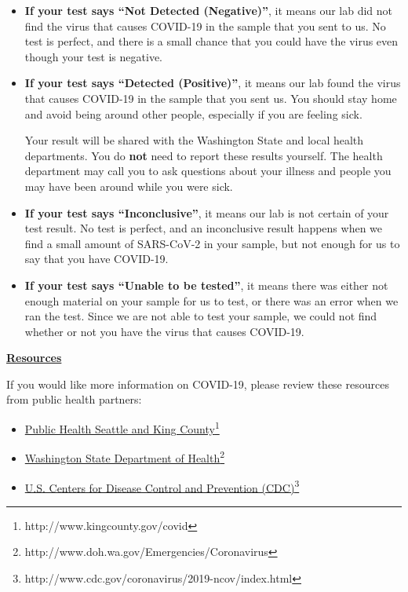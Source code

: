\documentclass[10pt]{article}
\newcommand{\link}[2]{\href{#1}{#2}\footnote{#1}}
\begin{document}
\begin{itemize}


\item

  \textbf{If your test says ``Not Detected (Negative)''}, it means our lab did not find the
  virus that causes COVID-19 in the sample that you sent to us. No test is
  perfect, and there is a small chance that you could have the virus even though
  your test is negative.

\item

  \textbf{If your test says ``Detected (Positive)''}, it means our
  lab found the virus that causes COVID-19 in the sample that you sent us. You
  should stay home and avoid being around other people, especially if you are
  feeling sick.

  Your result will be shared with the Washington State and local health
  departments. You do \textbf{not} need to report these results yourself. The
  health department may call you to ask questions about your illness and people
  you may have been around while you were sick.

\item

  \textbf{If your test says ``Inconclusive''}, it means our lab is not certain
  of your test result. No test is perfect, and an inconclusive result happens
  when we find a small amount of SARS-CoV-2 in your sample, but not enough for
  us to say that you have COVID-19.

\item

  \textbf{If your test says ``Unable to be tested''}, it means there was either
  not enough material on your sample for us to test, or there was an error when
  we ran the test. Since we are not able to test your sample, we could not find
  whether or not you have the virus that causes COVID-19.

\end{itemize}

\bigskip

\large \underline{\textbf{Resources}}

If you would like more information on COVID-19, please review these resources
from public health partners:

\begin{itemize}
\item

  \link{http://www.kingcounty.gov/covid}{Public Health Seattle and King County}

\item

  \link{http://www.doh.wa.gov/Emergencies/Coronavirus}{Washington State
  Department of Health}

\item

  \link{http://www.cdc.gov/coronavirus/2019-ncov/index.html}{U.S. Centers for
  Disease Control and Prevention (CDC)}

\end{itemize}
\end{document}
